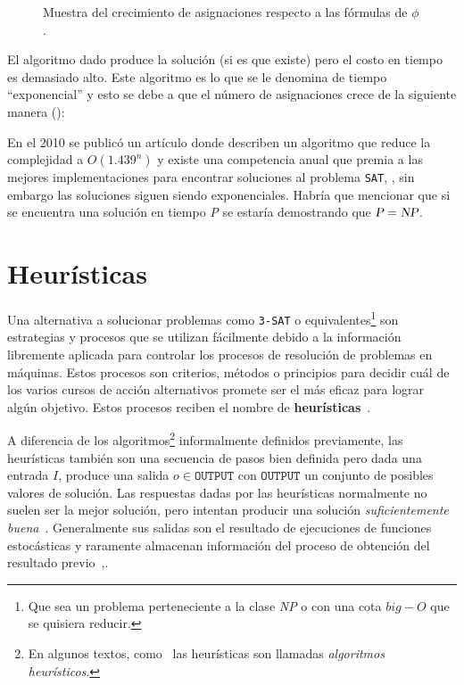 \begin{figure}[h]

\caption[short caption]{Muestra del crecimiento de asignaciones respecto a las fórmulas de $\phi$.}
\label{fig:satfigure}
\end{figure} 


El algoritmo dado produce la solución (si es que existe) pero el costo en tiempo
es demasiado alto. Este algoritmo es lo que se le denomina de tiempo ``exponencial'' y
esto se debe a que el número de asignaciones crece de la siguiente manera ():



En el 2010 se publicó un artículo donde describen un algoritmo que reduce la
complejidad a $O(1.439^{n})$ y existe una competencia anual que premia a las
mejores implementaciones para encontrar soluciones al problema
\texttt{SAT},\cite{Kutzkov2010} \cite{satcompetition}, sin embargo las
soluciones siguen siendo exponenciales.  Habría que mencionar que si se
encuentra una solución en tiempo \textsl{P} se estaría demostrando que
$\textsl{P}=\textsl{NP}$.

\section{Heurísticas}

Una alternativa a solucionar problemas como \texttt{3-SAT} o
equivalentes\footnote{Que sea un problema perteneciente a la clase \textsl{NP} o
  con una cota \textit{$big-O$} que se quisiera reducir.} son estrategias y procesos
que se utilizan fácilmente debido a la información libremente aplicada para
controlar los procesos de resolución de problemas en máquinas. Estos procesos
son criterios, métodos o principios para decidir cuál de los varios cursos de
acción alternativos promete ser el más eficaz para lograr algún objetivo. Estos
procesos reciben el nombre de \textbf{heurísticas}~\cite{Pearl1984}.

A diferencia de los algoritmos\footnote{En algunos textos, 
como~\cite{DeInformatica2010} las heurísticas son llamadas 
\textit{algoritmos heurísticos}.} informalmente definidos previamente, las
heurísticas también son una secuencia de pasos bien definida pero dada una
entrada $I$, produce una salida $o \in \texttt{OUTPUT}$ con $\texttt{OUTPUT}$ un
conjunto de posibles valores de solución.  Las respuestas dadas por las
heurísticas normalmente no suelen ser la mejor solución, pero intentan producir
una solución \emph{suficientemente buena}~\cite{Gigerenzer2008}.  Generalmente
sus salidas son el resultado de ejecuciones de funciones estocásticas y
raramente almacenan información del proceso de obtención del resultado
previo~\cite{heuristicdefoxford},\cite{Pearl1984}.

